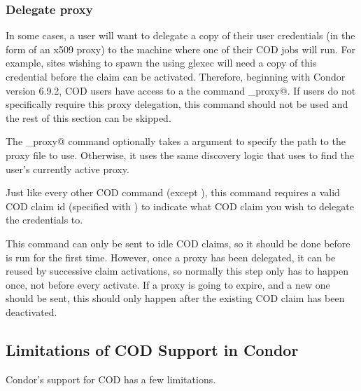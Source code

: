 
\subsubsection{\label{sec:cod-claim-delegate}Delegate proxy}

In some cases, a user will want to delegate a copy of their user
credentials (in the form of an x509 proxy) to the machine where one of
their COD jobs will run.
For example, sites wishing to spawn the  using glexec
will need a copy of this credential before the claim can be activated.
Therefore, beginning with Condor version 6.9.2, COD users have access
to a the command \verb@delegate_proxy@.
If users do not specifically require this proxy delegation, this
command should not be used and the rest of this section can be skipped.

The \verb@delegate_proxy@ command optionally takes a 
argument to specify the path to the proxy file to use.
Otherwise, it uses the same discovery logic that  uses
to find the user's currently active proxy.

Just like every other COD command (except \verb@request@), this
command requires a valid COD claim id (specified with ) to
indicate what COD claim you wish to delegate the credentials to.

This command can only be sent to idle COD claims, so it should be done
before \verb@activate@ is run for the first time.
However, once a proxy has been delegated, it can be reused by
successive claim activations, so normally this step only has to happen
once, not before every activate.
If a proxy is going to expire, and a new one should be sent, this
should only happen after the existing COD claim has been deactivated.


\subsection{\label{sec:cod-limitations}Limitations of COD Support in Condor}

Condor's support for COD has a few limitations.

